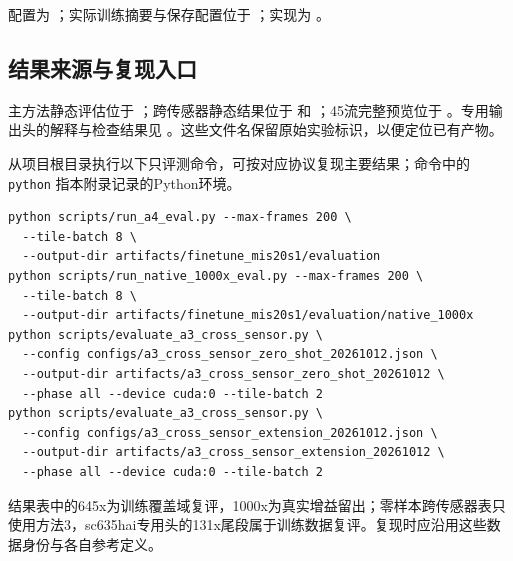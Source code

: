 配置为 ；实际训练摘要与保存配置位于 ；实现为 。

\subsection{结果来源与复现入口}

主方法静态评估位于 ；跨传感器静态结果位于  和 ；45流完整预览位于 。专用输出头的解释与检查结果见 。这些文件名保留原始实验标识，以便定位已有产物。

从项目根目录执行以下只评测命令，可按对应协议复现主要结果；命令中的 \texttt{python} 指本附录记录的Python环境。

{\small
\begin{verbatim}
python scripts/run_a4_eval.py --max-frames 200 \
  --tile-batch 8 \
  --output-dir artifacts/finetune_mis20s1/evaluation
python scripts/run_native_1000x_eval.py --max-frames 200 \
  --tile-batch 8 \
  --output-dir artifacts/finetune_mis20s1/evaluation/native_1000x
python scripts/evaluate_a3_cross_sensor.py \
  --config configs/a3_cross_sensor_zero_shot_20261012.json \
  --output-dir artifacts/a3_cross_sensor_zero_shot_20261012 \
  --phase all --device cuda:0 --tile-batch 2
python scripts/evaluate_a3_cross_sensor.py \
  --config configs/a3_cross_sensor_extension_20261012.json \
  --output-dir artifacts/a3_cross_sensor_extension_20261012 \
  --phase all --device cuda:0 --tile-batch 2
\end{verbatim}
}

结果表中的645x为训练覆盖域复评，1000x为真实增益留出；零样本跨传感器表只使用方法3，sc635hai专用头的131x尾段属于训练数据复评。复现时应沿用这些数据身份与各自参考定义。


